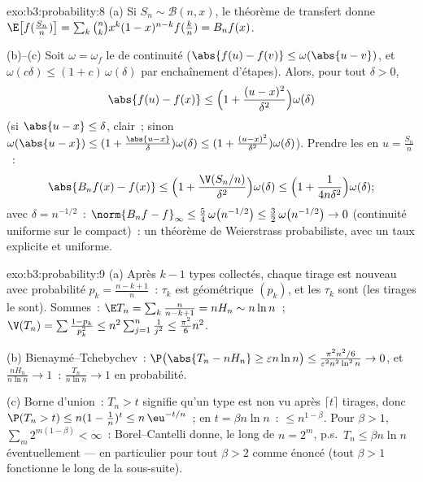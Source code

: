 \begin{solution}{exo:b3:probability:8}
(a) Si $S_n \sim \mathcal B(n, x)$, le théorème de
transfert donne $\E\bigl[f(\frac{S_n}n)\bigr] =
\sum_k\binom nkx^k(1-x)^{n-k}f(\frac kn) = B_nf(x)$.

(b)--(c) Soit $\omega = \omega_f$ le  de continuité
($\abs{f(u) - f(v)} \leq \omega(\abs{u - v})$, et
$\omega(c \delta) \leq (1 + c)\,\omega(\delta)$ par
enchaînement d'étapes). Alors, pour tout $\delta > 0$,
\[
\abs{f(u) - f(x)} \leq \Bigl(1 + \frac{(u -
x)^2}{\delta^2}\Bigr)\omega(\delta)
\]
(si $\abs{u - x} \leq \delta$, clair~; sinon
$\omega(\abs{u-x}) \leq (1 + \frac{\abs{u-x}}\delta)
\omega(\delta) \leq (1 + \frac{(u-x)^2}{\delta^2})
\omega(\delta)$). Prendre les  en $u =
\frac{S_n}n$~:
\[
\abs{B_nf(x) - f(x)} \leq
\Bigl(1 + \frac{\V(S_n/n)}{\delta^2}\Bigr)\omega(\delta)
\leq \Bigl(1 + \frac{1}{4n\delta^2}\Bigr)\omega(\delta) ;
\]
avec $\delta = n^{-1/2}$~: $\norm{B_nf - f}_\infty \leq
\frac54\,\omega\bigl(n^{-1/2}\bigr) \leq
\frac32\,\omega\bigl(n^{-1/2}\bigr) \to 0$ (continuité
uniforme sur le compact)~: un théorème de Weierstrass
probabiliste, avec un taux explicite et uniforme.
\end{solution}

\begin{solution}{exo:b3:probability:9}
(a) Après $k - 1$ types collectés, chaque tirage est
nouveau avec probabilité $p_k = \frac{n-k+1}n$~: $\tau_k$
est géométrique $(p_k)$, et les $\tau_k$ sont 
(les tirages le sont). Sommes~: $\E T_n = \sum_k\frac
n{n-k+1} = nH_n \sim n\ln n$~; $\V(T_n) = \sum\frac{1 -
p_k}{p_k^2} \leq n^2\sum_{j=1}^n\frac1{j^2} \leq
\frac{\pi^2}6n^2$.

(b) Bienaymé--Tchebychev~: $\P\bigl(\abs{T_n - nH_n} \geq
\varepsilon n\ln n\bigr) \leq
\frac{\pi^2n^2/6}{\varepsilon^2n^2\ln^2n} \to 0$, et
$\frac{nH_n}{n\ln n} \to 1$~: $\frac{T_n}{n\ln n} \to 1$ en
probabilité.

(c) Borne d'union~: $T_n > t$ signifie qu'un type est non vu
après $\lceil t\rceil$ tirages, donc $\P(T_n > t) \leq n(1
- \frac1n)^{t} \leq n\,\eu^{-t/n}$~; en $t = \beta n\ln
n$~: $\leq n^{1 - \beta}$. Pour $\beta > 1$, $\sum_m
2^{m(1-\beta)} < \infty$~: Borel--Cantelli donne, le long
de $n = 2^m$, p.s.\ $T_n \leq \beta n\ln n$ éventuellement
--- en particulier pour tout $\beta > 2$ comme énoncé (tout
$\beta > 1$ fonctionne le long de la sous-suite).
\end{solution}

